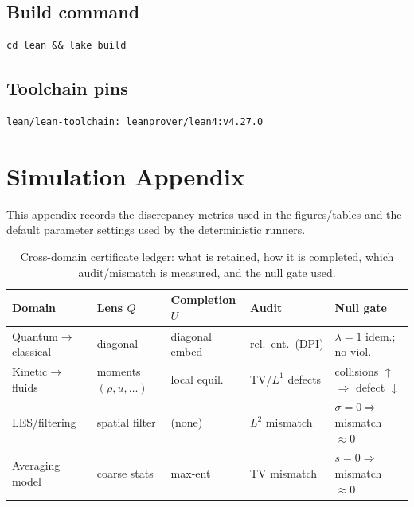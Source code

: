 \documentclass[11pt]{article}
\begin{document}
\subsection*{Build command}
\begin{verbatim}
cd lean && lake build
\end{verbatim}

\subsection*{Toolchain pins}
\begin{verbatim}
lean/lean-toolchain: leanprover/lean4:v4.27.0
\end{verbatim}
  \section{Simulation Appendix}
\label{app:sims}

This appendix records the discrepancy metrics used in the figures/tables and the default parameter settings used by the deterministic runners.

\clearpage
\begin{landscape}
\begin{table}[p]
\centering
\footnotesize
\begin{tabular}{lllll}
\toprule
Domain & Lens $Q$ & Completion $U$ & Audit & Null gate \\
\midrule
Quantum$\to$classical & diagonal & diagonal embed & rel.\ ent.\ (DPI) & $\lambda{=}1$ idem.; no viol. \\
Kinetic$\to$fluids & moments $(\rho,u,\dots)$ & local equil. & TV/$L^1$ defects & collisions $\uparrow$ $\Rightarrow$ defect $\downarrow$ \\
LES/filtering & spatial filter & (none) & $L^2$ mismatch & $\sigma{=}0 \Rightarrow$ mismatch ${\approx}0$ \\
Averaging model & coarse stats & max-ent & TV mismatch & $s{=}0 \Rightarrow$ mismatch ${\approx}0$ \\
\bottomrule
\end{tabular}
\caption{Cross-domain certificate ledger: what is retained, how it is completed, which audit/mismatch is measured, and the null gate used.}
\label{tab:certificate-ledger}
\end{table}
\end{landscape}
\clearpage
\end{document}
